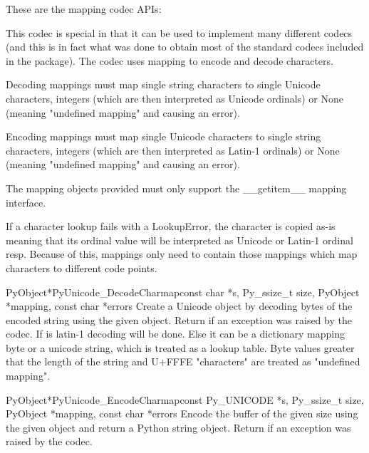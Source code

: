 These are the mapping codec APIs:

This codec is special in that it can be used to implement many
different codecs (and this is in fact what was done to obtain most of
the standard codecs included in the  package). The
codec uses mapping to encode and decode characters.

Decoding mappings must map single string characters to single Unicode
characters, integers (which are then interpreted as Unicode ordinals)
or None (meaning "undefined mapping" and causing an error).

Encoding mappings must map single Unicode characters to single string
characters, integers (which are then interpreted as Latin-1 ordinals)
or None (meaning "undefined mapping" and causing an error).

The mapping objects provided must only support the __getitem__ mapping
interface.

If a character lookup fails with a LookupError, the character is
copied as-is meaning that its ordinal value will be interpreted as
Unicode or Latin-1 ordinal resp. Because of this, mappings only need
to contain those mappings which map characters to different code
points.

\begin{cfuncdesc}{PyObject*}{PyUnicode_DecodeCharmap}{const char *s,
                                               Py_ssize_t size,
                                               PyObject *mapping,
                                               const char *errors}
  Create a Unicode object by decoding  bytes of the encoded
  string  using the given  object.  Return
  \NULL{} if an exception was raised by the codec. If  is \NULL{}
  latin-1 decoding will be done. Else it can be a dictionary mapping byte or a
  unicode string, which is treated as a lookup table. Byte values greater
  that the length of the string and U+FFFE "characters" are treated as
  "undefined mapping".
\end{cfuncdesc}

\begin{cfuncdesc}{PyObject*}{PyUnicode_EncodeCharmap}{const Py_UNICODE *s,
                                               Py_ssize_t size,
                                               PyObject *mapping,
                                               const char *errors}
  Encode the  buffer of the given size using the
  given  object and return a Python string object.
  Return \NULL{} if an exception was raised by the codec.
\end{cfuncdesc}

